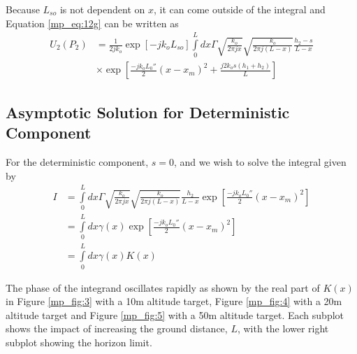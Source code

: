Because $L_{so}$ is not dependent on $x$, it can come outside of the integral and Equation \ref{mp_eq:12g} can be written as
\begin{equation}
\begin{aligned}
U_2(P_2)&= \frac{1}{2jk_o}\exp\left[-jk_oL_{so}\right]\int\limits_{0}^{L}dx\Gamma \sqrt{\frac{k_o}{2\pi jx}}\sqrt{\frac{k_o}{2\pi j (L-x)}}\frac{h_2-s}{L-x}\\ &\times\exp\left[\frac{-jk_oL_0''}{2}(x-x_m)^2+\frac{j2k_os(h_1+h_2)}{L}\right]
\label{mp_eq:21}
\end{aligned}
\end{equation}
\renewcommand{\baselinestretch}{2} \small\normalsize

\subsection{Asymptotic Solution for Deterministic Component}
For the deterministic component, $s = 0$, and we wish to solve the integral given by
\begin{equation}
\begin{aligned}
I &= \int\limits_{0}^{L}dx\Gamma \sqrt{\frac{k_o}{2\pi jx}}\sqrt{\frac{k_o}{2\pi j (L-x)}}\frac{h_2}{L-x}\exp\left[\frac{-jk_oL_0''}{2}(x-x_m)^2\right] \\
&= \int\limits_{0}^{L}dx\gamma(x)\exp\left[\frac{-jk_oL_0''}{2}(x-x_m)^2\right] \\
&= \int\limits_{0}^{L}dx\gamma(x)K(x) 
\end{aligned}
\label{mp_eq:22}
\end{equation}

The phase of the integrand oscillates rapidly as shown by the real part of $K(x)$ in Figure \ref{mp_fig:3} with a 10m altitude target, Figure \ref{mp_fig:4} with a 20m altitude target and Figure \ref{mp_fig:5} with a 50m altitude target. Each subplot shows the impact of increasing the ground distance, $L$, with the lower right subplot showing the horizon limit.

